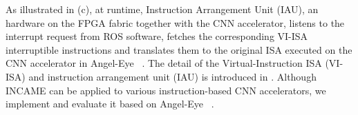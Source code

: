 As illustrated in (c), at runtime, Instruction Arrangement Unit (IAU), an hardware on the FPGA fabric together with the CNN accelerator, listens to the interrupt request from ROS software, fetches the corresponding VI-ISA interruptible instructions and translates them to the original ISA executed on the CNN accelerator in Angel-Eye  ~\cite{guo2017angel}. 
The detail of the Virtual-Instruction ISA (VI-ISA) and instruction arrangement unit (IAU) is introduced in . 
Although INCAME can be applied to various instruction-based CNN accelerators, we implement and evaluate it based on Angel-Eye  ~\cite{guo2017angel}.

